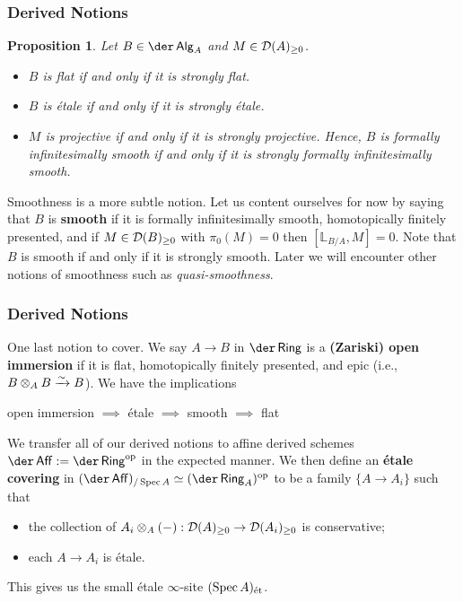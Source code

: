 \documentclass[11pt]{beamer}
\newtheorem*{proposition*}{Proposition}
\newcommand{\LL}{\mathbb{L}}
\begin{document}
\begin{frame}
\frametitle{Derived Notions}
\pause
\begin{proposition*}
Let $B\in\der\Alg_A$ and $M\in\mathcal{D}(A)_{\geq0}$.
\begin{itemize}
\pause\item $B$ is flat if and only if it is strongly flat.
\pause\item $B$ is \'{e}tale if and only if it is strongly \'{e}tale.
\pause\item $M$ is projective if and only if it is strongly projective. Hence, $B$ is formally infinitesimally smooth if and only if it is strongly formally infinitesimally smooth.
\end{itemize}
\end{proposition*}
\pause Smoothness is a more subtle notion. Let us content ourselves for now by saying that $B$ is \textbf{smooth} if it is formally infinitesimally smooth, homotopically finitely presented, and if $M\in\mathcal{D}(B)_{\geq0}$ with $\pi_0(M)=0$ then $[\LL_{B/A},M]=0$. \pause Note that $B$ is smooth if and only if it is strongly smooth. Later we will encounter other notions of smoothness such as \emph{quasi-smoothness}.
\end{frame}

\begin{frame}
\frametitle{Derived Notions}
\pause One last notion to cover. We say $A\to B$ in $\der\Ring$ is a \textbf{(Zariski) open immersion} if it is flat, homotopically finitely presented, and epic (i.e., $B\otimes_AB\xrightarrow{\sim}B$). \pause We have the implications
\begin{center}
open immersion $\implies$ \'{e}tale $\implies$ smooth $\implies$ flat
\end{center}
\pause We transfer all of our derived notions to affine derived schemes $\der\Aff:=\der\Ring^{\op}$ in the expected manner. \pause We then define an \textbf{\'{e}tale covering} in $(\der\Aff)_{/\Spec A}\simeq(\der\Ring_A)^{\op}$ to be a family $\{A\to A_i\}$ such that 
\begin{itemize}
\pause\item the collection of $A_i\otimes_A(-): \mathcal{D}(A)_{\geq0}\to\mathcal{D}(A_i)_{\geq0}$ is conservative;
\pause\item each $A\to A_i$ is \'{e}tale.
\end{itemize}
\pause This gives us the small \'{e}tale $\infty$-site $(\operatorname{Spec} A)_{\operatorname{\acute{e}t}}$.
\end{frame}
\end{document}
